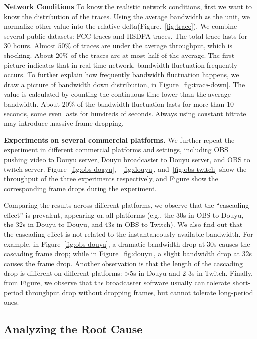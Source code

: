 
\textbf{Network Conditions} To know the realistic network conditions, first we want to know the distribution of the traces. Using the average bandwidth as the unit, we normalize other value into the
relative delta(Figure.~\ref{fig:trace}). We combine several public datasets: FCC traces and HSDPA traces. The total trace lasts for $30$ hours. Almost $50\%$ of traces are under the average throughput, which is shocking. About $20\%$ of the traces are at most half of the average. The first picture indicates that in real-time network, bandwidth fluctuation frequently occurs. To further explain how frequently bandwidth fluctuation happens, we draw a picture of bandwidth down distribution, in Figure~\ref{fig:trace-down}. The value is calculated by counting the continuous time lower than the average bandwidth. About $20\%$ of the bandwidth fluctuation lasts for more than $10$ seconds, some even lasts for hundreds of seconds. Always using constant bitrate may introduce massive frame dropping.


\textbf{Experiments on several commercial platforms.} We further repeat the experiment in different commercial platforms and settings, including OBS pushing video to Douyu server, Douyu broadcaster to Douyu server, and OBS to twitch server.
Figure~\ref{fig:obs-douyu}, ~\ref{fig:douyu}, and~\ref{fig:obs-twitch} show the throughput of the three experiments respectively, and Figure show the corresponding frame drops during the experiment.

Comparing the results across different platforms, we observe that the ``cascading effect'' is prevalent, appearing on all platforms (e.g., the 30s in OBS to Douyu, the 32s in Douyu to Douyu, and 43s in OBS to Twitch). We also find out that the cascading effect is not related to the instantaneously available bandwidth. For example, in Figure~\ref{fig:obs-douyu}, a dramatic bandwidth drop at 30s causes the cascading frame drop; while in Figure~\ref{fig:douyu}, a slight bandwidth drop at 32s causes the frame drop. Another observation is that the length of the cascading drop is different on different platforms: >5s in Douyu and 2-3s in Twitch. Finally, from Figure, we observe that the broadcaster software usually can tolerate short-period throughput drop without dropping frames, but cannot tolerate long-period ones.

\subsection{Analyzing the Root Cause}


